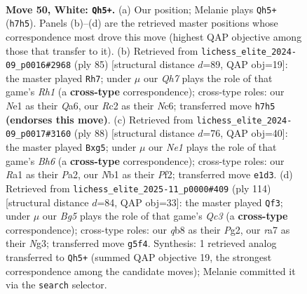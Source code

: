 \documentclass[11pt]{article}
\begin{document}
\clearpage

\begin{figure}[p]\centering
\begin{subfigure}{0.46\textwidth}\centering
\resizebox{\linewidth}{!}{%
\newchessgame
\chessboard[
  setfen={1qb1k3/r6Q/4p3/p2pPpB1/P1n4P/3p4/2R5/RN2N1K1 w - - 1 50},
  showmover=false,
  pgfstyle=straightmove, color=movearrow, markmove={h7-h5}
]}
\caption{}
\end{subfigure}\hfill
\begin{subfigure}{0.46\textwidth}\centering
\resizebox{\linewidth}{!}{%
\newchessgame
\chessboard[
  setfen={4k2r/8/q1n1bB2/2QpPp2/1p1P3p/7P/3N1PPK/8 b - - 2 43},
  showmover=false,
  pgfstyle=straightmove, color=movearrow, markmove={h8-h7}
]}
\caption{}
\end{subfigure}
\\[4pt]
\begin{subfigure}{0.46\textwidth}\centering
\resizebox{\linewidth}{!}{%
\newchessgame
\chessboard[
  setfen={7k/2q2p2/p5rB/1p2R1n1/4Q3/N1P5/PP3P2/5K2 w - - 0 45},
  showmover=false,
  pgfstyle=straightmove, color=movearrow, markmove={h6-g5}
]}
\caption{}
\end{subfigure}\hfill
\begin{subfigure}{0.46\textwidth}\centering
\resizebox{\linewidth}{!}{%
\newchessgame
\chessboard[
  setfen={6k1/6p1/2pqrp1p/2Rn4/1P6/p1Q3NP/P4PP1/6K1 w - - 2 58},
  showmover=false,
  pgfstyle=straightmove, color=movearrow, markmove={c3-f3}
]}
\caption{}
\end{subfigure}
\caption{\textbf{Move 50, White: \texttt{Qh5+}.} (a) Our position; Melanie plays \texttt{Qh5+} (\texttt{h7h5}). Panels (b)--(d) are the retrieved master positions whose correspondence most drove this move (highest QAP objective among those that transfer to it). (b) Retrieved from \texttt{lichess\_elite\_2024-09\_p0016\#2968} (ply 85) [structural distance $d$=89, QAP obj=19]: the master played \texttt{Rh7}; under $\mu$ our \emph{Qh7} plays the role of that game's \emph{Rh1} (a \textbf{cross-type} correspondence); cross-type roles: our \emph{N}e1 as their \emph{Q}a6, our \emph{R}c2 as their \emph{N}c6; transferred move \texttt{h7h5} \textbf{(endorses this move)}. (c) Retrieved from \texttt{lichess\_elite\_2024-09\_p0017\#3160} (ply 88) [structural distance $d$=76, QAP obj=40]: the master played \texttt{Bxg5}; under $\mu$ our \emph{Ne1} plays the role of that game's \emph{Bh6} (a \textbf{cross-type} correspondence); cross-type roles: our \emph{R}a1 as their \emph{P}a2, our \emph{N}b1 as their \emph{P}f2; transferred move \texttt{e1d3}. (d) Retrieved from \texttt{lichess\_elite\_2025-11\_p0000\#409} (ply 114) [structural distance $d$=84, QAP obj=33]: the master played \texttt{Qf3}; under $\mu$ our \emph{Bg5} plays the role of that game's \emph{Qc3} (a \textbf{cross-type} correspondence); cross-type roles: our \emph{q}b8 as their \emph{P}g2, our \emph{r}a7 as their \emph{N}g3; transferred move \texttt{g5f4}. Synthesis: 1 retrieved analog transferred to \texttt{Qh5+} (summed QAP objective 19, the strongest correspondence among the candidate moves); Melanie committed it via the \texttt{search} selector.}
\label{fig:thought-m98}
\end{figure}
\end{document}
